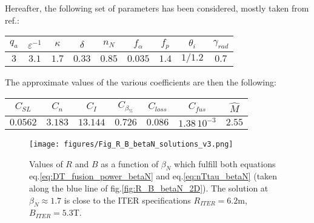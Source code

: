 Hereafter, the following set of parameters has been considered, mostly taken from ref.\cite{Johner2011}:
\begin{center}
	\begin{tabular}{c|c|c|c|c|c|c|c|c}
		\hline
		$q_a$ & $\varepsilon^{-1}$ & $\kappa$ & $\delta$ & $n_N$ & $f_\alpha$ & $f_p$ & $\theta_i$ & $\gamma_{rad}$ \\
		\hline
		$3$   & $3.1$ & $1.7$ & $0.33$ & $0.85$ & $0.035$ & $1.4$ & $1/1.2$ & $0.7$ \\
		\hline	
	\end{tabular}
\end{center}
The approximate values of the various coefficients are then the following:
\begin{center}
	\begin{tabular}{c|c|c|c|c|c|c}
		\hline
		$C_{SL}$ & $C_n$ & $C_I$ & $C_{\beta_\%}$ & $C_{loss}$ & $C_{fus}$ & $\hat M$ \\
		\hline
		$0.0562$ & $3.183$ & $13.144$ & $0.726$ & $0.086$ & $1.38\,10^{-3}$ & $2.55$ \\
		\hline	
	\end{tabular}
\end{center}
\bigskip

\begin{figure} 
	\centering
	\texttt{[image: figures/Fig\_R\_B\_betaN\_solutions\_v3.png]}
	\caption{Values of $R$ and $B$ as a function of $\beta_N$ which fulfill both equations eq.\ref{eq:DT_fusion_power_betaN} and eq.\ref{eq:nTtau_betaN} (taken along the blue line of fig.\ref{fig:R_B_betaN_2D}). The solution at $\beta_N \approx 1.7$ is close to the ITER specifications $R_{ITER}=6.2$m, $B_{ITER}=5.3$T.}
	\label{fig:solutions_betaN}
\end{figure}




